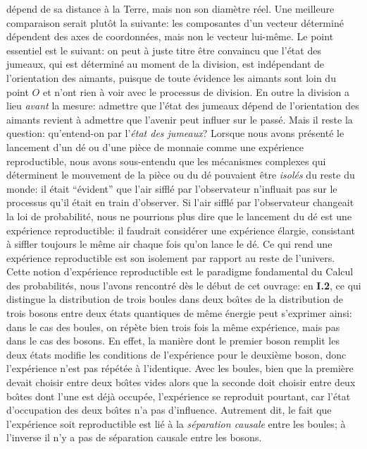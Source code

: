 d\'epend de sa distance \`a la Terre, mais non son diam\`etre r\'eel.  
Une meilleure comparaison serait plut\^ot la suivante: les composantes 
d'un vecteur d\'etermin\'e d\'ependent des axes de coordonn\'ees, mais  
non le vecteur lui-m\^eme.  
\medskip 
Le point essentiel est le suivant: on peut \`a juste titre \^etre convaincu 
que l'\'etat des jumeaux, qui est d\'etermin\'e au moment de la division, 
est ind\'ependant de l'orientation des aimants,  puisque de toute 
\'evidence les aimants sont loin du point $O$ et n'ont rien \`a voir avec  
le processus de division. En outre la division a lieu {\it avant} la mesure: 
admettre que l'\'etat des jumeaux d\'epend de l'orientation des aimants  
revient \`a admettre que l'avenir peut influer sur le pass\'e. 
\medskip 
Mais il reste la question: qu'entend-on par l'{\it \'etat des jumeaux}? 
Lorsque nous avons pr\'esent\'e le lancement d'un d\'e ou d'une pi\`ece de 
monnaie comme une exp\'erience reproductible, nous avons sous-entendu 
que les m\'ecanismes complexes qui d\'eterminent le mouvement de la 
pi\`ece ou du d\'e pouvaient \^etre {\it isol\'es} du reste du monde: il 
\'etait ``\'evident'' que l'air siffl\'e par l'observateur n'influait pas
sur le processus qu'il \'etait en train d'observer. Si l'air siffl\'e par  
l'observateur  changeait la loi de probabilit\'e, nous ne pourrions plus  
dire que le lancement du d\'e est une exp\'erience  reproductible: il 
faudrait consid\'erer une exp\'erience \'elargie, consistant \`a siffler 
toujours le m\^eme air chaque fois qu'on lance le d\'e.  
Ce qui rend une exp\'erience reproductible est son isolement par rapport  
au reste de l'univers. Cette notion d'exp\'erience reproductible  est le 
paradigme fondamental du Calcul des probabilit\'es, nous l'avons 
rencontr\'e d\`es le d\'ebut de cet ouvrage: en {\bf I.2}, ce qui distingue  
la distribution de trois boules  dans deux bo\^\i tes de la distribution  
de trois bosons entre deux \'etats quantiques de m\^eme \'energie peut 
s'exprimer ainsi: dans le cas des boules, on r\'ep\`ete bien trois fois la 
m\^eme exp\'erience, mais pas  dans le cas des bosons.  En effet, la 
mani\`ere  dont le premier boson remplit les deux \'etats modifie les 
conditions de l'exp\'erience pour  le deuxi\`eme boson, donc  
l'exp\'erience n'est pas r\'ep\'et\'ee \`a  l'identique. Avec les boules,  
bien que la premi\`ere  devait choisir entre deux bo\^\i tes vides alors  
que la seconde doit  choisir  entre deux bo\^\i tes dont l'une est d\'ej\`a 
occup\'ee, l'exp\'erience  se reproduit pourtant, car l'\'etat d'occupation 
des deux  bo\^\i tes n'a pas d'influence. Autrement dit, le fait que  
l'exp\'erience soit  reproductible est li\'e \`a la {\it s\'eparation  
causale} entre les boules;  \`a l'inverse il n'y a pas de s\'eparation  
causale entre les bosons.     
 

